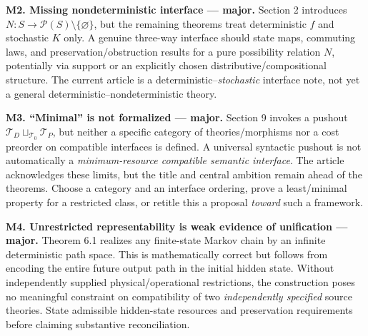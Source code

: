 \documentclass[11pt,letterpaper]{article}
\begin{document}
\textbf{M2. Missing nondeterministic interface --- major.} Section 2 introduces $N:S\to \mathcal P(S)\setminus\{\varnothing\}$, but the remaining theorems treat deterministic $f$ and stochastic $K$ only. A genuine three-way interface should state maps, commuting laws, and preservation/obstruction results for a pure possibility relation $N$, potentially via support or an explicitly chosen distributive/compositional structure. The current article is a deterministic--\emph{stochastic} interface note, not yet a general deterministic--nondeterministic theory.

\textbf{M3. ``Minimal'' is not formalized --- major.} Section 9 invokes a pushout $\mathcal T_D\sqcup_{\mathcal T_0}\mathcal T_P$, but neither a specific category of theories/morphisms nor a cost preorder on compatible interfaces is defined. A universal syntactic pushout is not automatically a \emph{minimum-resource compatible semantic interface}. The article acknowledges these limits, but the title and central ambition remain ahead of the theorems. Choose a category and an interface ordering, prove a least/minimal property for a restricted class, or retitle this a proposal \emph{toward} such a framework.

\textbf{M4. Unrestricted representability is weak evidence of unification --- major.} Theorem 6.1 realizes any finite-state Markov chain by an infinite deterministic path space. This is mathematically correct but follows from encoding the entire future output path in the initial hidden state. Without independently supplied physical/operational restrictions, the construction poses no meaningful constraint on compatibility of two \emph{independently specified} source theories. State admissible hidden-state resources and preservation requirements before claiming substantive reconciliation.
\end{document}
